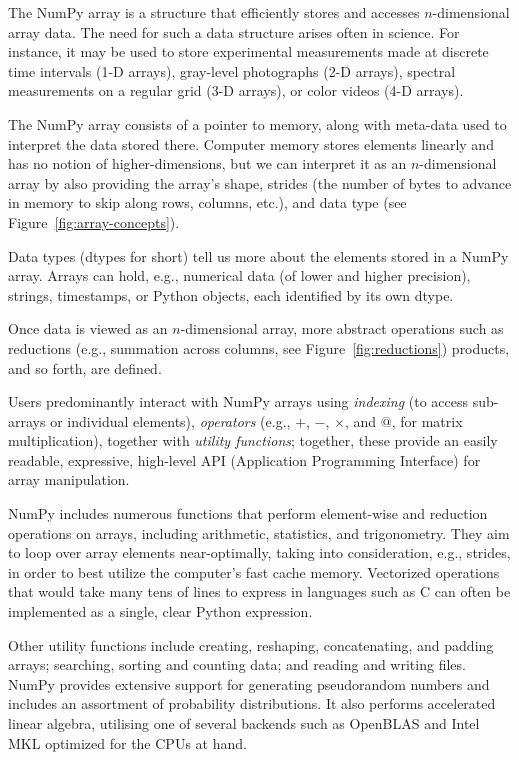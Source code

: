 The NumPy array is a structure that efficiently stores and accesses
$n$-dimensional array data\cite{vanderwalt2011numpy}.
The need for such a data structure arises often in science.
For instance, it may be used to store experimental measurements made at
discrete time intervals (1-D arrays), gray-level photographs (2-D arrays),
spectral measurements on a regular grid (3-D arrays), or color videos (4-D
arrays).

The NumPy array consists of a pointer to memory, along with meta-data used to
interpret the data stored there.
Computer memory stores elements linearly and has no notion
of higher-dimensions, but we can interpret it as an $n$-dimensional array by also
providing the array's shape, strides (the number of bytes to advance in memory to skip
along rows, columns, etc.), and data type (see Figure~\ref{fig:array-concepts}).

Data types (dtypes for short) tell us more about the elements stored in a NumPy
array.
Arrays can hold, e.g., numerical data (of lower and higher precision), strings,
timestamps, or Python objects, each identified by its own dtype.

Once data is viewed as an $n$-dimensional array, more abstract operations such
as reductions (e.g., summation across columns, see Figure~\ref{fig:reductions}) products, and so forth, are
defined.

Users predominantly interact with NumPy arrays using {\em indexing} (to access sub-arrays or individual elements), {\em operators} (e.g., $+$, $-$, $\times$, and $@$, for matrix multiplication), together with {\em utility functions}; together, these provide an easily readable, expressive, high-level API (Application Programming Interface) for array manipulation.

NumPy includes numerous functions that perform element-wise and reduction operations on arrays, including arithmetic, statistics, and trigonometry.  They aim to loop over array elements near-optimally, taking into consideration, e.g., strides, in order to best utilize the computer's fast cache memory.  Vectorized operations that would take many tens of lines to express in languages such as C can often be implemented as a single, clear Python expression.

Other utility functions include creating, reshaping, concatenating, and padding arrays; searching, sorting and counting data; and reading and writing files.  NumPy provides extensive support for generating pseudorandom numbers and includes an assortment of probability distributions. It also performs accelerated linear algebra, utilising one of several backends such as OpenBLAS and Intel MKL optimized for the CPUs at hand.

